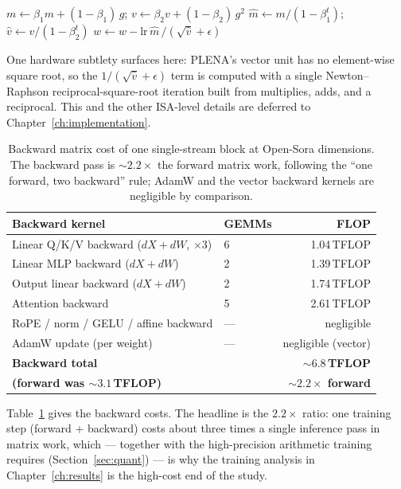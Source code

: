 \documentclass[11pt]{report}
\begin{document}
\begin{algorithm}[H]
\DontPrintSemicolon
{}
$m \leftarrow \beta_1 m + (1-\beta_1)\,g$;\quad
$v \leftarrow \beta_2 v + (1-\beta_2)\,g^2$\;
$\hat m \leftarrow m/(1-\beta_1^t)$;\quad
$\hat v \leftarrow v/(1-\beta_2^t)$\;
$w \leftarrow w - \mathrm{lr}\,\hat m\,/(\sqrt{\hat v}+\epsilon)$\;
\caption{AdamW update (vector, element-wise per weight)}
\end{algorithm}

\noindent One hardware subtlety surfaces here: PLENA's vector unit has no
element-wise square root, so the $1/(\sqrt{\hat v}+\epsilon)$ term is
computed with a single Newton--Raphson reciprocal-square-root iteration
built from multiplies, adds, and a reciprocal. This and the other
ISA-level details are deferred to Chapter~\ref{ch:implementation}.

\begin{table}[t]
\centering
\caption{Backward matrix cost of one single-stream block at Open-Sora
dimensions. The backward pass is ${\sim}2.2\times$ the forward matrix
work, following the ``one forward, two backward'' rule; AdamW and the
vector backward kernels are negligible by comparison.}
\label{tab:bwd-kernels}
\begin{tabular}{@{}llr@{}}
\toprule
Backward kernel & GEMMs & FLOP \\
\midrule
Linear Q/K/V backward ($dX{+}dW$, $\times 3$) & 6 & 1.04\,TFLOP \\
Linear MLP backward ($dX{+}dW$) & 2 & 1.39\,TFLOP \\
Output linear backward ($dX{+}dW$) & 2 & 1.74\,TFLOP \\
Attention backward & 5 & 2.61\,TFLOP \\
RoPE / norm / GELU / affine backward & --- & negligible \\
AdamW update (per weight) & --- & negligible (vector) \\
\midrule
\textbf{Backward total} & & \textbf{${\sim}6.8$\,TFLOP} \\
\textbf{(forward was ${\sim}3.1$\,TFLOP)} & & \textbf{${\sim}2.2\times$ forward} \\
\bottomrule
\end{tabular}
\end{table}

Table~\ref{tab:bwd-kernels} gives the backward costs. The headline is the
$2.2\times$ ratio: one training step (forward + backward) costs about three
times a single inference pass in matrix work, which --- together with the
high-precision arithmetic training requires (Section~\ref{sec:quant}) --- is
why the training analysis in Chapter~\ref{ch:results} is the high-cost end
of the study.
\end{document}
